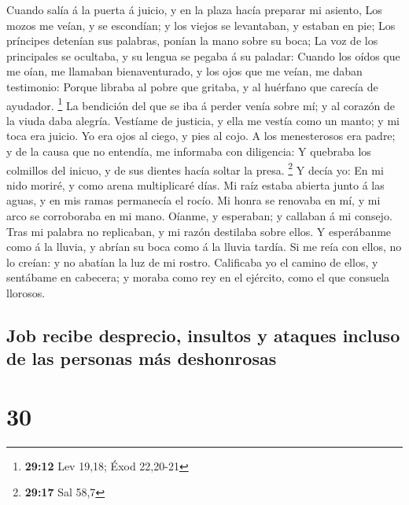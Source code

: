  Cuando salía á la puerta á juicio, y en la plaza hacía
preparar mi asiento,  Los mozos me veían, y se escondían; y
los viejos se levantaban, y estaban en pie;  Los príncipes
detenían sus palabras, ponían la mano sobre su boca;  La
voz de los principales se ocultaba, y su lengua se pegaba á su paladar:
 Cuando los oídos que me oían, me llamaban bienaventurado,
y los ojos que me veían, me daban testimonio:  Porque
libraba al pobre que gritaba, y al huérfano que carecía de ayudador.
\footnote{\textbf{29:12} Lev 19,18; Éxod 22,20-21}  La
bendición del que se iba á perder venía sobre mí; y al corazón de la
viuda daba alegría.  Vestíame de justicia, y ella me vestía
como un manto; y mi toca era juicio.  Yo era ojos al ciego,
y pies al cojo.  A los menesterosos era padre; y de la
causa que no entendía, me informaba con diligencia:  Y
quebraba los colmillos del inicuo, y de sus dientes hacía soltar la
presa. \footnote{\textbf{29:17} Sal 58,7}  Y decía yo: En
mi nido moriré, y como arena multiplicaré días.  Mi raíz
estaba abierta junto á las aguas, y en mis ramas permanecía el rocío.
 Mi honra se renovaba en mí, y mi arco se corroboraba en mi
mano.  Oíanme, y esperaban; y callaban á mi consejo.
 Tras mi palabra no replicaban, y mi razón destilaba sobre
ellos.  Y esperábanme como á la lluvia, y abrían su boca
como á la lluvia tardía.  Si me reía con ellos, no lo
creían: y no abatían la luz de mi rostro.  Calificaba yo el
camino de ellos, y sentábame en cabecera; y moraba como rey en el
ejército, como el que consuela llorosos.

\hypertarget{job-recibe-desprecio-insultos-y-ataques-incluso-de-las-personas-muxe1s-deshonrosas}{%
\subsection{Job recibe desprecio, insultos y ataques incluso de las
personas más
deshonrosas}\label{job-recibe-desprecio-insultos-y-ataques-incluso-de-las-personas-muxe1s-deshonrosas}}

\hypertarget{section-29}{%
\section{30}\label{section-29}}

